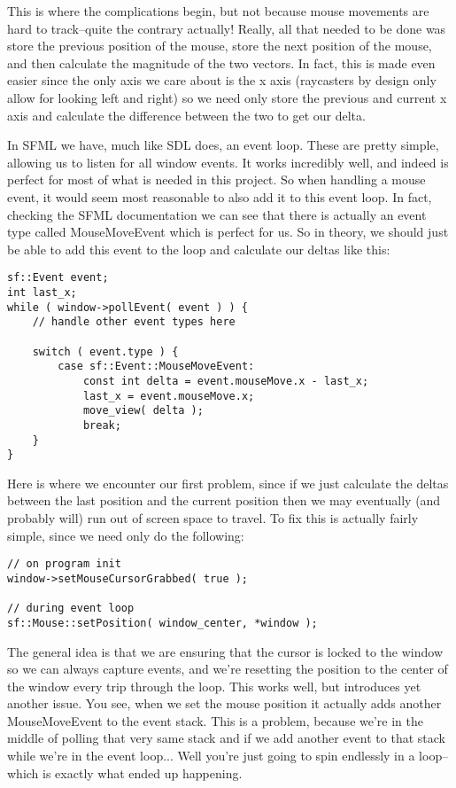 \documentclass{article}
\begin{document}
This is where the complications begin, but not because mouse movements are hard
to track--quite the contrary actually! Really, all that needed to be done was
store the previous position of the mouse, store the next position of the mouse,
and then calculate the magnitude of the two vectors. In fact, this is made even
easier since the only axis we care about is the x axis (raycasters by design
only allow for looking left and right) so we need only store the previous and
current x axis and calculate the difference between the two to get our delta.

In SFML we have, much like SDL does, an event loop. These are pretty simple,
allowing us to listen for all window events. It works incredibly well, and
indeed is perfect for most of what is needed in this project. So when handling a
mouse event, it would seem most reasonable to also add it to this event loop. In
fact, checking the SFML documentation we can see that there is actually an event
type called MouseMoveEvent which is perfect for us. So in theory, we should just
be able to add this event to the loop and calculate our deltas like this:

\begin{verbatim}
sf::Event event;
int last_x;
while ( window->pollEvent( event ) ) {
    // handle other event types here

    switch ( event.type ) {
        case sf::Event::MouseMoveEvent:
            const int delta = event.mouseMove.x - last_x;
            last_x = event.mouseMove.x;
            move_view( delta );
            break;
    }
}
\end{verbatim}

Here is where we encounter our first problem, since if we just calculate the
deltas between the last position and the current position then we may eventually
(and probably will) run out of screen space to travel. To fix this is actually
fairly simple, since we need only do the following:

\begin{verbatim}
// on program init
window->setMouseCursorGrabbed( true );

// during event loop
sf::Mouse::setPosition( window_center, *window );
\end{verbatim}

The general idea is that we are ensuring that the cursor is locked to the window
so we can always capture events, and we're resetting the position to the center
of the window every trip through the loop. This works well, but introduces yet
another issue. You see, when we set the mouse position it actually adds another
MouseMoveEvent to the event stack. This is a problem, because we're in the
middle of polling that very same stack and if we add another event to that stack
while we're in the event loop... Well you're just going to spin endlessly in a
loop--which is exactly what ended up happening.
\end{document}
